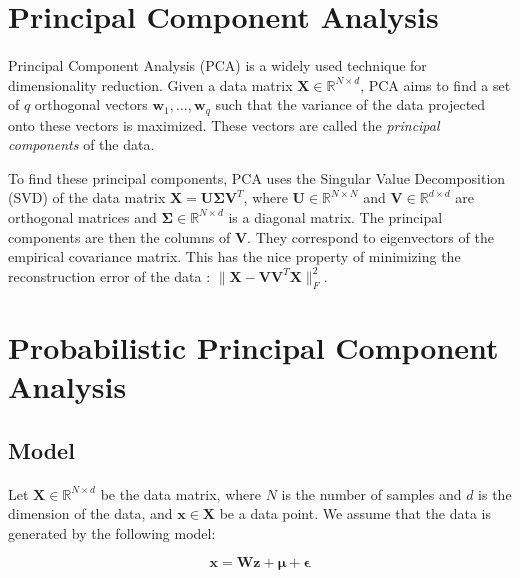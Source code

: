 \documentclass{article}
\newcommand{\R}{\mathbb{R}}
\begin{document}
\section{Principal Component Analysis}
\label{sec:pca}

\paragraph{} Principal Component Analysis (PCA) is a widely used technique for dimensionality reduction. Given a data matrix $\mathbf{X} \in \R^{N \times d}$, PCA aims to find a set of $q$ orthogonal vectors $\mathbf{w}_1, \ldots, \mathbf{w}_q$ such that the variance of the data projected onto these vectors is maximized. These vectors are called the \emph{principal components} of the data.

To find these principal components, PCA uses the Singular Value Decomposition (SVD) of the data matrix $\mathbf{X} = \mathbf{U}\mathbf{\Sigma}\mathbf{V}^T$, where $\mathbf{U} \in \R^{N \times N}$ and $\mathbf{V} \in \R^{d \times d}$ are orthogonal matrices and $\mathbf{\Sigma} \in \R^{N \times d}$ is a diagonal matrix. The principal components are then the columns of $\mathbf{V}$. They correspond to eigenvectors of the empirical covariance matrix. This has the nice property of minimizing the reconstruction error of the data : $\|\mathbf{X} - \mathbf{V}\mathbf{V}^T\mathbf{X}\|_F^2$.

\section{Probabilistic Principal Component Analysis}
\label{sec:ppca}

\subsection{Model}

\paragraph{} Let $\mathbf{X} \in \R^{N \times d}$ be the data matrix, where $N$ is the number of samples and $d$ is the dimension of the data, and $\mathbf{x} \in \mathbf{X}$ be a data point. We assume that the data is generated by the following model:

\begin{equation}
    \label{eq:ppca_model}
    \mathbf{x} = \mathbf{Wz} + \boldsymbol{\mu} + \boldsymbol{\epsilon}
\end{equation}
    
\end{document}

